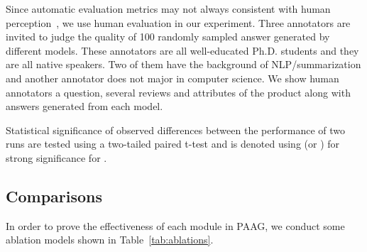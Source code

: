 Since automatic evaluation metrics may not always consistent with human perception~\cite{Stent2005EvaluatingEM}, we use human evaluation in our experiment. 
Three annotators are invited to judge the quality of 100 randomly sampled answer generated by different models. 
These annotators are all well-educated Ph.D. students and they are all native speakers. 
Two of them have the background of NLP/summarization and another annotator does not major in computer science.
We show human annotators a question, several reviews and attributes of the product along with answers generated from each model.

Statistical significance of observed differences between the performance of two runs are tested using a two-tailed paired t-test and is denoted using \dubbelop (or \dubbelneer) for strong significance for . 

\subsection{Comparisons} \label{sec:baselines}

In order to prove the effectiveness of each module in PAAG, we conduct some ablation models shown in Table~\ref{tab:ablations}.

